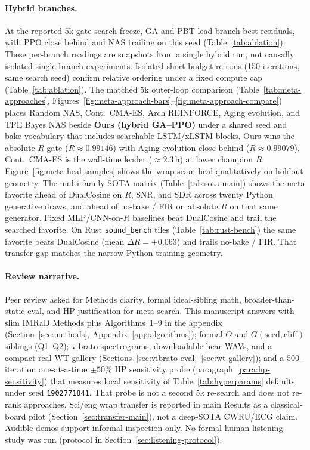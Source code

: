 \paragraph{Hybrid branches.}
At the reported $5$k-gate search freeze, GA and PBT lead branch-best residuals, with PPO close behind and NAS trailing on this seed (Table~\ref{tab:ablation}).
These per-branch readings are snapshots from a single hybrid run, not causally isolated single-branch experiments.
Isolated short-budget re-runs (150 iterations, same search seed) confirm relative ordering under a fixed compute cap (Table~\ref{tab:ablation}).
The matched $5$k outer-loop comparison (Table~\ref{tab:meta-approaches}, Figures~\ref{fig:meta-approach-bars}--\ref{fig:meta-approach-compare}) places Random NAS, Cont.\ CMA-ES, Arch REINFORCE, Aging evolution, and TPE Bayes NAS beside \textbf{Ours (hybrid GA--PPO)} under a shared seed and bake vocabulary that includes searchable LSTM/xLSTM blocks.
Ours wins the absolute-$R$ gate ($R\approx 0.99146$) with Aging evolution close behind ($R\approx 0.99079$).
Cont.\ CMA-ES is the wall-time leader ($\approx 2.3$\,h) at lower champion $R$.
Figure~\ref{fig:meta-heal-samples} shows the wrap-seam heal qualitatively on holdout geometry.
The multi-family SOTA matrix (Table~\ref{tab:sota-main}) shows the meta favorite ahead of DualCosine on $R$, SNR, and SDR across twenty Python generative draws, and ahead of no-bake / FIR on absolute $R$ on that same generator.
Fixed MLP/CNN-on-$R$ baselines beat DualCosine and trail the searched favorite.
On Rust \texttt{sound\_bench} tiles (Table~\ref{tab:rust-bench}) the same favorite beats DualCosine (mean $\Delta R={+}0.063$) and trails no-bake / FIR.
That transfer gap matches the narrow Python training geometry.

\paragraph{Review narrative.}
Peer review asked for Methods clarity, formal ideal-sibling math, broader-than-static eval, and HP justification for meta-search.
This manuscript answers with slim IMRaD Methods plus Algorithms~1--9 in the appendix (Section~\ref{sec:methods}, Appendix~\ref{app:algorithms}); formal $\Theta$ and $G(\mathrm{seed},\mathrm{cliff})$ siblings (Q1--Q2); vibrato spectrograms, downloadable hear WAVs, and a compact real-WT gallery (Sections~\ref{sec:vibrato-eval}--\ref{sec:wt-gallery}); and a $500$-iteration one-at-a-time $\pm 50\%$ HP sensitivity probe (paragraph~\ref{para:hp-sensitivity}) that measures local sensitivity of Table~\ref{tab:hyperparams} defaults under seed \texttt{1902771841}.
That probe is not a second $5$k re-search and does not re-rank approaches.
Sci/eng wrap transfer is reported in main Results as a classical-board pilot (Section~\ref{sec:transfer-main}), not a deep-SOTA CWRU/ECG claim.
Audible demos support informal inspection only. No formal human listening study was run (protocol in Section~\ref{sec:listening-protocol}).
